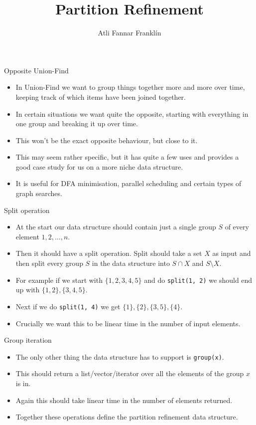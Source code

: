 \documentclass{beamer}
\title{Partition Refinement}
\author{Atli Fannar Franklín}
\institute{\href{http://ru.is/td}{School of Computer Science} \\[2pt] \href{http://ru.is}{Reykjavík University}}
\begin{document}
	\maketitle
	
	\begin{frame}[plain]{Opposite Union-Find}
		\vspace{30pt}
		\begin{itemize}
			\item In Union-Find we want to group things together more and more over time, keeping track of which items have been joined together.
			\item In certain situations we want quite the opposite, starting with everything in one group and breaking it up over time.
			\item This won't be the exact opposite behaviour, but close to it.
			\item This may seem rather specific, but it has quite a few uses and provides a good case study for us on a more niche data structure.
			\item It is useful for DFA minimisation, parallel scheduling and certain types of graph searches.
		\end{itemize}
	\end{frame}
	
	\begin{frame}[plain]{Split operation}
		\begin{itemize}
			\item At the start our data structure should contain just a single group $S$ of every element $1, 2, \dots, n$.
			\item Then it should have a split operation. Split should take a set $X$ as input and then split every group $S$ in the data structure into $S \cap X$ and $S \setminus X$.
			\item For example if we start with $\{1, 2, 3, 4, 5\}$ and do \texttt{split(1, 2)} we should end up with $\{1, 2\}, \{3, 4, 5\}$.
			\item Next if we do \texttt{split(1, 4)} we get $\{1\}, \{2\}, \{3, 5\}, \{4\}$.
			\item Crucially we want this to be linear time in the number of input elements.
		\end{itemize}
	\end{frame}
	
	\begin{frame}[plain]{Group iteration}
		\begin{itemize}
			\item The only other thing the data structure has to support is \texttt{group(x)}.
			\item This should return a list/vector/iterator over all the elements of the group $x$ is in.
			\item Again this should take linear time in the number of elements returned.
			\item Together these operations define the partition refinement data structure.
		\end{itemize}
	\end{frame}
	
\end{document}
